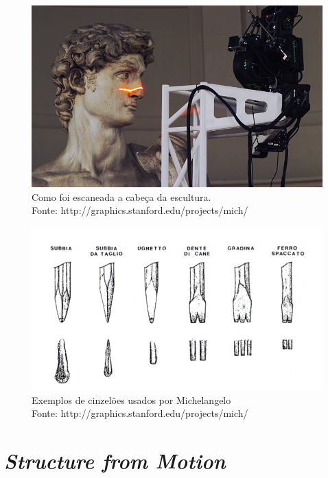 \documentclass[table, usenames, svgnames, xcolor=dvipsnames]{beamer}
\begin{document}
\begin{frame} 
	\begin{center}
	\begin{figure}[!h]
		\centering
		\includegraphics[width=0.7\linewidth]{figs/scanner-head-and-david-head-s.jpg}
		\caption{%
		Como foi escaneada a cabeça da escultura. \\
		\tiny{Fonte: http://graphics.stanford.edu/projects/mich/}
		}
	\end{figure}
		
	\end{center}
\end{frame}

\begin{frame} 
	\begin{center}
		\centering
		\begin{figure}[!h]
			\includegraphics[width=0.7\linewidth]{figs/ferramentasMich.png}
			\caption{%
			Exemplos de cinzelões usados por Michelangelo \\
			\tiny{Fonte: http://graphics.stanford.edu/projects/mich/}
			}
		\end{figure}
	\end{center}
\end{frame}

\section{\emph{Structure from Motion}}
\end{document}

